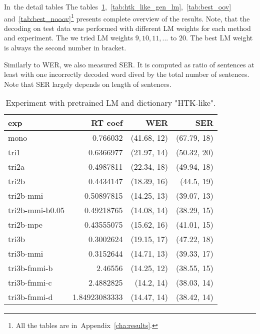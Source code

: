 {

In~the detail tables 
The tables~\ref{tab:htk_like},~\ref{tab:htk_like_gen_lm},~\ref{tab:best_oov} 
and~\ref{tab:best_nooov}\footnote{All the tables are in~Appendix~\ref{cha:results}.} presents complete overview of the results. 
Note, that the decoding on test data was performed with different \ac{LM} weights for each method and experiment. 
The we tried \ac{LM} weights $9, 10, 11, ...$ to $20$. 
The best \ac{LM} weight is always the second number in bracket.

Similarly to \ac{WER}, we also measured \ac{SER}. It is computed as ratio of sentences at least with one incorrectly decoded word dived by the total number of sentences. Note that \ac{SER} largely depends on length of sentences. 

\begin{table}[!htp]\label{tab:htk_like}\centering\begin{tabular}{l|rrr}
exp             & RT coef       & WER         & SER        \\ 
\hline
mono            & 0.766032      & (41.68, 12) & (67.79, 18)\\ 
tri1            & 0.6366977     & (21.97, 14) & (50.32, 20)\\ 
tri2a           & 0.4987811     & (22.34, 18) & (49.94, 18)\\ 
tri2b           & 0.4434147     & (18.39, 16) & (44.5, 19) \\ 
tri2b-mmi       & 0.50897815    & (14.25, 13) & (39.07, 13)\\ 
tri2b-mmi-b0.05 & 0.49218765    & (14.08, 14) & (38.29, 15)\\ 
tri2b-mpe       & 0.43555075    & (15.62, 16) & (41.01, 15)\\ 
tri3b           & 0.3002624     & (19.15, 17) & (47.22, 18)\\ 
tri3b-mmi       & 0.3152644     & (14.71, 13) & (39.33, 17)\\ 
tri3b-fmmi-b    & 2.46556       & (14.25, 12) & (38.55, 15)\\ 
tri3b-fmmi-c    & 2.4882825     & (14.2, 14)  & (38.03, 14)\\ 
tri3b-fmmi-d    & 1.84923083333 & (14.47, 14) & (38.42, 14)
\end{tabular}
\caption{Experiment with pretrained LM and dictionary "\ac{HTK}-like".}
\end{table}  

}

